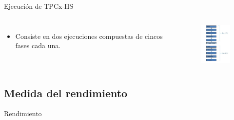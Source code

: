 		\begin{frame}{Ejecución de TPCx-HS}
				\begin{columns}[c]
					\begin{itemize}
						\item Consiste en dos ejecuciones compuestas de cincos fases cada una.
					\end{itemize}
					
					\begin{figure}[H]
						\centering
						\includegraphics[width=2cm]{./Images/executionsTPC.png}
					\end{figure}

				\end{columns}
	
		\end{frame}
		
	\subsection*{Medida del rendimiento}	
			
		\begin{frame}{Rendimiento}
			
		\end{frame}
				 